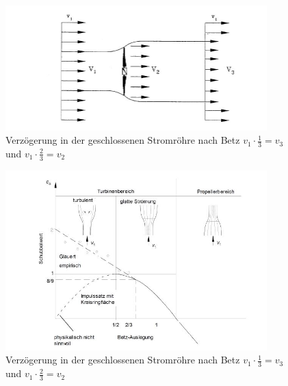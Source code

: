 \begin{figure}[H]
    \centering
    \includegraphics[width=0.9\textwidth]{Abbildungen/Betz.jpg}
    \caption{Verzögerung in der geschlossenen Stromröhre nach Betz $v_{1} \cdot \frac{1}{3}=v_{3}$ und  $v_{1} \cdot \frac{2}{3}=v_{2} $ \cite{Anleitung}}
    \label{fig:Betz2905}
\end{figure}

\begin{figure}[H]
    \centering
    \includegraphics[width=0.9\textwidth]{Abbildungen/Glauert.jpg}
    \caption{Verzögerung in der geschlossenen Stromröhre nach Betz $v_{1} \cdot \frac{1}{3}=v_{3}$ und  $v_{1} \cdot \frac{2}{3}=v_{2} $\cite{Anleitung}}
    \label{fig:Glauert}
\end{figure}
